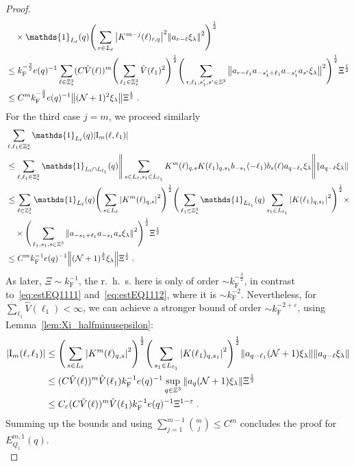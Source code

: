 \documentclass[12pt,a4paper]{article}
\numberwithin{equation}{section}
\newcommand{\1}{\mathbb{I}}
\newcommand{\F}{\mathrm{F}}
\newcommand{\I}{\mathrm{I}}
\newcommand{\Z}{\mathbb{Z}}
\newcommand{\NN}{\mathcal{N}}
\newcommand{\half}{\frac{1}{2}}
\theoremstyle{plain}
\theoremstyle{definition}
\theoremstyle{remark}
\theoremstyle{plain}
\theoremstyle{definition}
\theoremstyle{remark}
\begin{document}
\begin{proof}
\begin{align}
	&\quad \times \mathds{1}_{L_\ell}(q) \Bigg( \sum\limits_{r\in L_{\ell}} \abs{K^{m-j}(\ell)_{r,q}}^2 \norm{a_{r-\ell} \xi_\lambda }^2 \Bigg)^\half\nonumber\\
	&\leq k_{\F}^{-\frac 32} e(q)^{-1}
		\sum_{\ell \in \Z^3_*} (C \hat{V}(\ell))^m
		\Bigg( \sum_{\ell_1 \in \Z^3_*} \hat{V}(\ell_1)^2 \Bigg)^{\half} 
		\Bigg( \sum\limits_{r,\ell_1,s_1',s' \in \Z^3} \norm{a_{r-\ell_1} a_{-s_1'+\ell_1} a_{-s_1'} a_{s'} \xi_\lambda}^2 \Bigg)^\half
		\Xi^\half \nonumber\\
	&\leq C^m k_{\F}^{-\frac 32} e(q)^{-1}
		\norm{(\NN+1)^2 \xi_\lambda} \Xi^\half \;. \label{eq:estEQ1112}
\end{align}
For the third case $ j = m $, we proceed similarly
\begin{align}
	& \sum_{\ell,\ell_1 \in \Z^3_*} \mathds{1}_{L_\ell}(q) |\I_m(\ell, \ell_1)| \nonumber\\
	&\leq \sum_{\ell,\ell_1 \in \Z^3_*} \mathds{1}_{L_\ell \cap L_{\ell_1}}(q)
		\Bigg\Vert \sum\limits_{s\in L_{\ell}, s_1 \in L_{\ell_1}} K^m(\ell)_{q,s}K(\ell_1)_{q,s_1} b_{-s_1}(-\ell_1) b_{s}(\ell) a_{q-\ell_1}\xi_\lambda \Bigg\Vert
		\norm{ a_{q-\ell}\xi_\lambda }\nonumber\\
	&\leq \sum_{\ell \in \Z^3_*} \mathds{1}_{L_\ell}(q) \Bigg(\sum\limits_{s \in L_{\ell}} \abs{K^m(\ell)_{q,s}}^2\Bigg)^\half 
		\Bigg(\sum_{\ell_1 \in \Z^3_*} \mathds{1}_{L_{\ell_1}}(q) \sum\limits_{s_1 \in L_{\ell_1}} \abs{K(\ell_1)_{q,s_1}}^2\Bigg)^\half \times \nonumber\\
	&\quad \times \Bigg( \sum_{\ell_1, s_1, s \in \Z^3} \norm{ a_{-s_1+\ell_1} a_{-s_1} a_s \xi_\lambda}^2 \Bigg)^{\half} \Xi^\half \nonumber\\
	&\leq C^m k_{\F}^{-1} e(q)^{-1} \norm{ (\NN+1)^{\frac 32} \xi_\lambda}\Xi^\half \;. \label{eq:estEQ1113_Coulomb}
\end{align}
As later, $ \Xi \sim k_{\F}^{-1} $, the r.~h.~s. here is only of order $ \sim k_{\F}^{-\frac 32} $, in contrast to~\eqref{eq:estEQ1111} and~\eqref{eq:estEQ1112}, where it is $ \sim k_{\F}^{-2} $. Nevertheless, for $ \sum_{\ell_1} \hat{V}(\ell_1) < \infty $, we can achieve a stronger bound of order $ \sim k_{\F}^{-2 + \varepsilon} $, using Lemma~\ref{lem:Xi_halfminusepsilon}:
\begin{align}
	|\I_m(\ell, \ell_1)|
	&\leq \Bigg(\sum\limits_{s \in L_{\ell}} \abs{K^m(\ell)_{q,s}}^2\Bigg)^\half \Bigg(\sum\limits_{s_1 \in L_{\ell_1}} \abs{K(\ell_1)_{q,s_1}}^2\Bigg)^\half \norm{ a_{q-\ell_1} (\NN+1)\xi_\lambda} \norm{ a_{q-\ell}\xi_\lambda }\nonumber\\
	&\leq (C \hat{V}(\ell))^m \hat{V}(\ell_1) k_{\F}^{-1} e(q)^{-1} \sup_{q \in \Z^3}\norm{ a_{q} (\NN+1) \xi_\lambda}\Xi^\half\nonumber\\
	&\leq C_\varepsilon (C \hat{V}(\ell))^m \hat{V}(\ell_1) k_{\F}^{-1} e(q)^{-1} \Xi^{1-\varepsilon} \;. \label{eq:estEQ1113}
\end{align}
Summing up the bounds and using $\sum_{j=1}^{m-1} {{m}\choose j} \le C^m $ concludes the proof for $ E^{m,1}_{Q_1}(q) $.\\


\end{proof}
\end{document}

